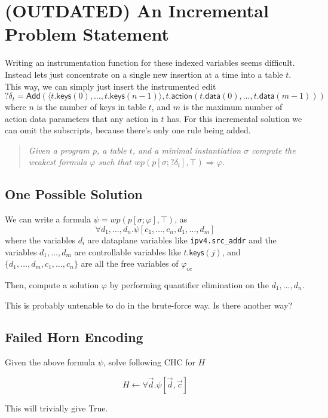 \documentclass{article}
\newcommand{\MatchRow}{\mathsf{keys}}
\newcommand{\ActionRow}{\mathsf{action}}
\newcommand{\ActionDataRow}{\mathsf{data}}
\begin{document}
\clearpage
\section{(OUTDATED) An Incremental Problem Statement}

Writing an instrumentation function for these indexed variables seems difficult.
Instead lets just concentrate on a single new insertion at a time into a table
$t$. This way, we can simply just insert the instrumented edit
\[?\delta_t = \mathsf{Add}(\langle t.\MatchRow(0),\ldots,
  t.\MatchRow(n-1)\rangle, t.\ActionRow(t.\ActionDataRow(0), \ldots,
  t.\ActionDataRow(m-1)))\] where $n$ is the number of keys in table
$t$, and $m$ is the maximum number of action data parameters that any
action in $t$ has. For this incremental solution we can omit the
subscripts, because there's only one rule being added.

\begin{quote}
  \it Given a program $p$, a table $t$, and a minimal instantiation
  $\sigma$ compute the weakest formula $\varphi$ such that
  $\mathit{wp}(p[\sigma;?\delta_t],\top) \Rightarrow \varphi$.
\end{quote}

\subsection{One Possible Solution}

We can write a formula $\psi = \mathit{wp}(p[\sigma;\varphi],\top)$, as
\[\forall d_1,\ldots, d_n. \psi[c_1,\ldots,c_n,d_1,\ldots,d_m]\]
where the variables $d_i$ are dataplane variables like
\texttt{ipv4.src\_addr} and the variables $d_1, \ldots, d_m$ are
controllable variables like $t.\MatchRow(j)$, and
$\{d_1,\ldots, d_m, c_1,\ldots, c_n\}$ are all the free variables of $\varphi_{\mathit{vc}}$

Then, compute a solution $\varphi$ by performing quantifier
elimination on the $d_1,\ldots,d_n$.

This is probably untenable to do in the brute-force way. Is there another way?

\subsection{Failed Horn Encoding}


Given the above formula $\psi$, solve following CHC for $H$

\[H \leftarrow \forall \vec d.\psi[\vec d, \vec c]\]

This will trivially give True.
\end{document}
